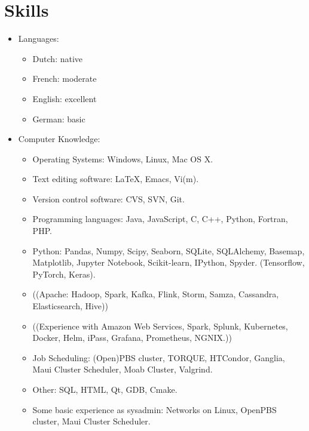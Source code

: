 \documentclass[11pt,a4paper,oneside,fleqn]{article}
\begin{document}
\section{Skills}
\begin{itemize}
\item Languages: 
\begin{itemize}
\item Dutch: native
\item French: moderate %
\item English: excellent
\item German: basic
\end{itemize}
\item Computer Knowledge: 
\begin{itemize}
\item Operating Systems: Windows, Linux, Mac OS X.
\item Text editing software: LaTeX, Emacs, Vi(m).
\item Version control software: CVS, SVN, Git.
\item Programming languages: Java, JavaScript, C, C++, Python, Fortran, %
   PHP.
\item Python: Pandas, Numpy, Scipy, Seaborn, SQLite, SQLAlchemy, Basemap, Matplotlib, Jupyter Notebook, Scikit-learn,
      IPython, Spyder.
(Tensorflow, PyTorch, Keras).
\item ((Apache: Hadoop, Spark, Kafka, Flink, Storm, Samza, Cassandra, Elasticsearch, Hive))
\item ((Experience with Amazon Web Services, Spark, Splunk, Kubernetes, Docker, Helm, iPass, Grafana, Prometheus, NGNIX.))


\item Job Scheduling: (Open)PBS cluster, TORQUE, HTCondor, Ganglia, Maui Cluster Scheduler, Moab Cluster,
Valgrind. 
\item Other: SQL, HTML, Qt, GDB, Cmake.

\item Some basic experience as sysadmin: Networks on Linux, OpenPBS cluster, Maui Cluster Scheduler.
\end{itemize}
\end{itemize}
\end{document}
